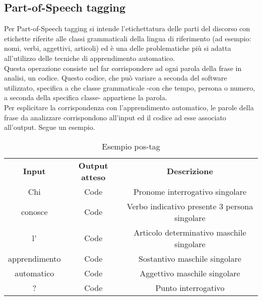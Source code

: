 \subsection{Part-of-Speech tagging}
Per Part-of-Speech tagging si intende l'etichettatura delle parti del discorso con etichette riferite alle classi grammaticali della lingua di riferimento (ad esempio: nomi, verbi, aggettivi, articoli) ed è una delle problematiche più si adatta all'utilizzo delle tecniche di apprendimento automatico. \\
Questa operazione consiste nel far corrispondere ad ogni parola della frase in analisi, un codice. Questo codice, che può variare a seconda del software utilizzato, specifica a che classe grammaticale -con che tempo, persona o numero, a seconda della specifica classe- appartiene la parola. \\
Per esplicitare la corrispondenza con l'apprendimento automatico, le parole della frase da analizzare corrispondono all'input ed il codice ad esse associato all'output. Segue un esempio. 

\begin{table}[h]
\centering
\begin{tabular}{| c | c | c |}
		\rowcolor{LightBlue}
		\color{white}\bfseries Input & \color{white}\bfseries Output atteso & \color{white}\bfseries Descrizione \\[0.25cm]
		 Chi & Code & Pronome interrogativo singolare \\
		 conosce & Code & Verbo indicativo presente 3 persona singolare \\
		 l' & Code & Articolo determinativo maschile singolare \\
		 apprendimento & Code & Sostantivo maschile singolare \\
		 automatico & Code & Aggettivo maschile singolare \\ 
		 ? & Code & Punto interrogativo \\ \hline
\end{tabular}
		\caption{Esempio pos-tag}
\end{table}